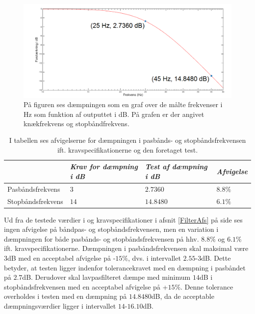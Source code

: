 \begin{figure}[H]
	\centering
	\includegraphics[scale=0.4]{figures/cProblemloesning/Lavpas_Matlab.PNG}
	\caption{På figuren ses dæmpningen som en graf over de målte frekvenser i Hz som funktion af outputtet i dB. På grafen er der angivet knækfrekvens og stopbåndfrekvens.}
	\label{fig:Lavpas_Matlab}
\end{figure}

\begin{table}[H]
	\centering
	\begin{tabular}{|l|l|l|l|}
		\hline
		& \textit{Krav for dæmpning i dB} 	& \textit{Test af dæmpning i dB}  &\textit{Afvigelse} \\ \hline
		Pasbåndsfrekvens & $3$	& $2.7360$	    & $8.8\%$ \\ \hline
		Stopbåndsfrekvens & $14$    & $14.8480$    & $6.1\%$  \\ \hline
	\end{tabular}
	\caption{I tabellen ses afvigelserne for dæmpningen i pasbånds- og stopbåndsfrekvensen ift. kravspecifikationerne og den foretaget test.}
	\label{Tab:Tolerance}
\end{table}
\noindent Ud fra de testede værdier i  og kravspecifikationer i afsnit \ref{FilterAfs} på side \pageref{FilterAfs} ses ingen afvigelse på båndpas- og stopbåndsfrekvensen, men en variation i dæmpningen for både pasbånds- og stopbåndsfrekvensen på hhv. $8.8\%$ og $6.1$\% ift. kravspecifikationerne. Dæmpningen i pasbåndsfrekvensen skal maksimal være $3$dB med en acceptabel afvigelse på -$15\%$, dvs. i intervallet $2.55$-$3$dB. Dette betyder, at testen ligger indenfor tolerancekravet med en dæmpning i pasbåndet på $2.7$dB. Derudover skal lavpasfilteret dæmpe med minimum $14$dB i stopbåndsfrekvensen med en acceptabel afvigelse på +$15\%$. Denne tolerance overholdes i testen med en dæmpning på $14.8480$dB, da de acceptable dæmpningsværdier ligger i intervallet $14$-$16.10$dB.\\

